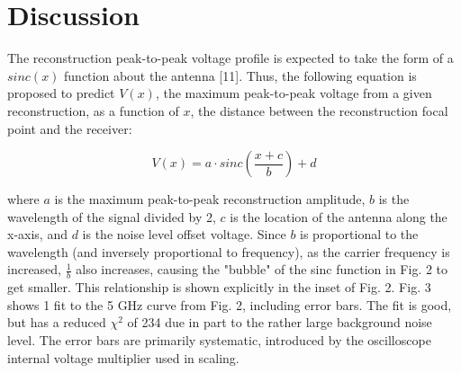 
\section{Discussion}
\label{sec:spatial-profile-discussion}

The reconstruction peak-to-peak voltage profile is expected to take the form of a $sinc(x)$ function about the antenna [11]. Thus, the following equation is proposed to predict $V(x)$, the maximum peak-to-peak voltage from a given reconstruction, as a function of $x$, the distance between the reconstruction focal point and the receiver:

$$V(x) = a\cdot sinc\left(\frac{x+c}{b}\right) + d$$

where $a$ is the maximum peak-to-peak reconstruction amplitude, $b$ is the wavelength of the signal divided by 2, $c$ is the location of the antenna along the x-axis, and $d$ is the noise level
offset voltage. Since $b$ is proportional to the wavelength (and inversely proportional
to frequency), as the carrier frequency is increased,  $\frac{1}{b}$ also increases, causing the "bubble" of the sinc function in Fig. 2 to get smaller. This relationship is shown explicitly in the inset of Fig. 2. Fig. 3 shows 1 fit to the 5 GHz curve from Fig. 2, including error bars. The fit is good, but has a reduced $\chi^2$ of 234 due in part to the rather large background noise level. The error bars are primarily systematic, introduced by the oscilloscope internal voltage multiplier used in scaling.
